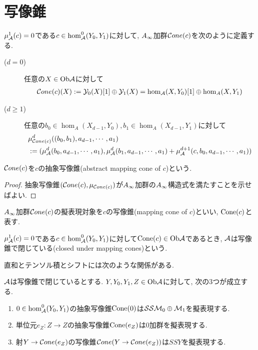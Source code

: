 \documentclass[uplatex, a4paper, 14Q, dvipdfmx]{jsarticle}
\begin{document}
\section{写像錐}

\begin{definition}[抽象写像錐]
  $\mu^1_{\mathcal{A}}(c)= 0$である$c \in \hom^0_{\mathcal{A}}(Y_0,Y_1)$に対して, $A_{\infty}$加群$\mathcal{C} one(c)$を次のように定義する. 
  \begin{description}
    \item[($d=0$)] 任意の$X \in \mathrm{Ob}\mathcal{A}$に対して
    \begin{align*}
      \mathcal{C} one(c)(X) := \mathcal{Y}_0(X)[1] \oplus \mathcal{Y}_1(X) = \hom_{\mathcal{A}}(X,Y_0)[1] \oplus \hom_A(X,Y_1)
    \end{align*}
    \item[($d \geq 1$)] 任意の$b_0 \in \hom_A(X_{d-1},Y_0), b_1 \in \hom_A(X_{d-1},Y_1)$に対して
    \begin{align*}
      &\mu^d_{\mathcal{C} one(c)}((b_0,b_1),a_{d-1},\cdots,a_1) \\
      &:= (\mu^d_{\mathcal{A}}(b_0,a_{d-1},\cdots,a_1), \mu^d_{\mathcal{A}}(b_1,a_{d-1},\cdots,a_1) + \mu^{d+1}_{\mathcal{A}}(c,b_0,a_{d-1},\cdots,a_1))
    \end{align*}
  \end{description}
  $\mathcal{C} one(c)$を$c$の抽象写像錐(abstract mapping cone of $c$)という. 
\end{definition}

\begin{proof}
  抽象写像錐$(\mathcal{C} one(c), \mu_{\mathcal{C} one(c)})$が$A_{\infty}$加群の$A_{\infty}$構造式を満たすことを示せばよい.
\end{proof}

\begin{notation}[写像錐]
  $A_{\infty}$加群$\mathcal{C} one(c)$の擬表現対象を$c$の写像錐(mapping cone of $c$)といい, $\mathrm{Cone}(c)$と表す. 
\end{notation}

\begin{definition}[写像錐で閉じている]
  $\mu^1_{\mathcal{A}}(c)= 0$である$c \in \hom^0_{\mathcal{A}}(Y_0,Y_1)$に対して$\mathrm{Cone}(c) \in \mathrm{Ob}\mathcal{A}$であるとき, $\mathcal{A}$は写像錐で閉じている(closed under mapping cones)という. 
\end{definition}

直和とテンソル積とシフトには次のような関係がある.

\begin{example} \label{eg_cone_of_zero}
  $\mathcal{A}$は写像錐で閉じているとする. 
  $Y, Y_0 , Y_1, Z\in \mathrm{Ob}\mathcal{A}$に対して, 次の3つが成立する. 
  \begin{enumerate}
    \item $0 \in \hom^0_{\mathcal{A}}(Y_0,Y_1)$の抽象写像錐$\mathrm{Cone}(0)$は$\mathcal{SS} \mathcal{M}_0 \oplus \mathcal{M}_1$を擬表現する.
    \item 単位元$e_Z : Z \to Z$の抽象写像錐$\mathrm{Cone}(e_Z)$は$0$加群を擬表現する.
    \item 射$Y \to \mathcal{C} one(e_Z)$の写像錐$\mathcal{C} one(Y \to \mathcal{C} one(e_Z))$は$SSY$を擬表現する. 
  \end{enumerate}
\end{example}
\end{document}

